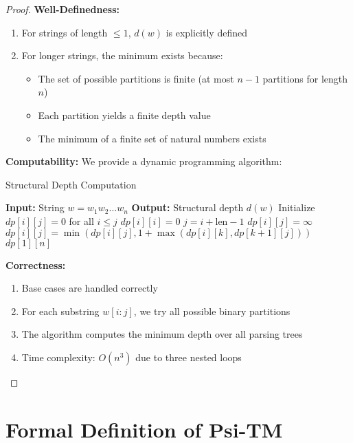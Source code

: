 \documentclass[11pt]{article}
\begin{document}
\begin{proof}
\textbf{Well-Definedness:}
\begin{enumerate}
\item For strings of length $\leq 1$, $d(w)$ is explicitly defined
\item For longer strings, the minimum exists because:
  \begin{itemize}
  \item The set of possible partitions is finite (at most $n-1$ partitions for length $n$)
  \item Each partition yields a finite depth value
  \item The minimum of a finite set of natural numbers exists
  \end{itemize}
\end{enumerate}

\textbf{Computability:}
We provide a dynamic programming algorithm:

\begin{algorithm}
\caption{Structural Depth Computation}
\begin{algorithmic}
\STATE \textbf{Input:} String $w = w_1w_2\ldots w_n$
\STATE \textbf{Output:} Structural depth $d(w)$
\STATE Initialize $dp[i][j] = 0$ for all $i \leq j$
    \STATE $dp[i][i] = 0$ 
\ENDFOR
{}
        \STATE $j = i + \text{len} - 1$
        \STATE $dp[i][j] = \infty$
            \STATE $dp[i][j] = \min(dp[i][j], 1 + \max(dp[i][k], dp[k+1][j]))$
        \ENDFOR
    \ENDFOR
\ENDFOR
\RETURN $dp[1][n]$
\end{algorithmic}
\end{algorithm}

\textbf{Correctness:}
\begin{enumerate}
\item Base cases are handled correctly
\item For each substring $w[i:j]$, we try all possible binary partitions
\item The algorithm computes the minimum depth over all parsing trees
\item Time complexity: $O(n^3)$ due to three nested loops
\end{enumerate}
\end{proof}

\section{Formal Definition of Psi-TM}
\end{document}
